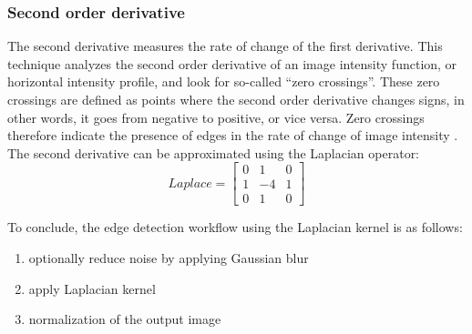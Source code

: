 \subsubsection*{Second order derivative}
The second derivative measures the rate of change of the first derivative.
This technique analyzes the second order derivative of an image intensity function, or horizontal intensity profile,
and look for so-called ``zero crossings''.
These zero crossings are defined as points where the second order derivative changes signs,
in other words, it goes from negative to positive, or vice versa.
Zero crossings therefore indicate the presence of edges in the rate of change of image intensity \cite{gonzalezDigitalImageProcessing2007}.
The second derivative can be approximated using the Laplacian operator:
\begin{equation}
	Laplace =
	\begin{bmatrix}
		0 & 1  & 0 \\
		1 & -4 & 1 \\
		0 & 1  & 0
	\end{bmatrix}
\end{equation}

\noindent
To conclude, the edge detection workflow using the Laplacian kernel is as follows:
\begin{enumerate}
	\item optionally reduce noise by applying Gaussian blur
	\item apply Laplacian kernel
	\item normalization of the output image
\end{enumerate}

